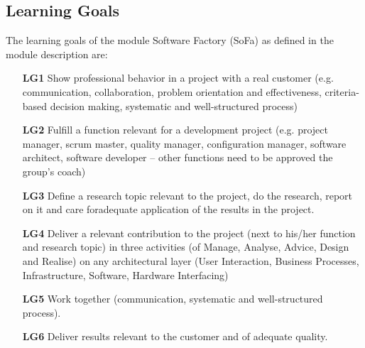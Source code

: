 \subsection{Learning Goals}
\label{ssec:learning}
The learning goals of the module Software Factory (SoFa) as defined in the module description are:

\begin{itemize}
	\item[\textbf{LG1}] Show professional behavior in a project with a real customer (e.g. communication, collaboration, problem orientation and effectiveness, criteria-based decision making, systematic and well-structured process)
	\item[\textbf{LG2}] Fulfill a function relevant for a development project (e.g. project manager, scrum master, quality manager, configuration manager, software architect, software developer – other functions need to be approved the group’s coach)
	\item[\textbf{LG3}] Define a research topic relevant to the project, do the research, report on it and care foradequate application of the results in the project.
	\item[\textbf{LG4}] Deliver a relevant contribution to the project (next to his/her function and research topic) in three activities (of Manage, Analyse, Advice, Design and Realise) on any architectural layer (User Interaction, Business Processes, Infrastructure, Software, Hardware Interfacing)
	\item[\textbf{LG5}] Work together (communication, systematic and well-structured process).
	\item[\textbf{LG6}] Deliver results relevant to the customer and of adequate quality.
	
	\label{table:learninggoals}
\end{itemize}
